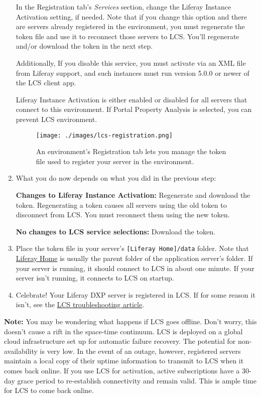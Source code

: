 \begin{enumerate}
  In the Registration tab's \emph{Services} section, change the Liferay
  Instance Activation setting, if needed. Note that if you change this
  option and there are servers already registered in the environment,
  you must regenerate the token file and use it to reconnect those
  servers to LCS. You'll regenerate and/or download the token in the
  next step.

  Additionally, If you disable this service, you must activate via an
  XML file from Liferay support, and such instances must run version
  5.0.0 or newer of the LCS client app.

  Liferay Instance Activation is either enabled or disabled for all
  servers that connect to this environment. If Portal Property Analysis
  is selected, you can prevent LCS environment.

  \begin{figure}
  \centering
  \texttt{[image: ./images/lcs-registration.png]}
  \caption{An environment's Registration tab lets you manage the token
  file used to register your server in the environment.}
  \end{figure}
\item
  What you do now depends on what you did in the previous step:

  \textbf{Changes to Liferay Instance Activation:} Regenerate and
  download the token. Regenerating a token causes all servers using the
  old token to disconnect from LCS. You must reconnect them using the
  new token.

  \textbf{No changes to LCS service selections:} Download the token.
\item
  Place the token file in your server's
  \texttt{{[}Liferay\ Home{]}/data} folder. Note that
  \href{/docs/7-2/deploy/-/knowledge_base/d/liferay-home}{Liferay Home}
  is usually the parent folder of the application server's folder. If
  your server is running, it should connect to LCS in about one minute.
  If your server isn't running, it connects to LCS on startup.
\item
  Celebrate! Your Liferay DXP server is registered in LCS. If for some
  reason it isn't, see the
  \href{/docs/7-2/deploy/-/knowledge_base/d/troubleshooting-your-lcs-connection}{LCS
  troubleshooting article}.
\end{enumerate}

\noindent\hrulefill

\textbf{Note:} You may be wondering what happens if LCS goes offline.
Don't worry, this doesn't cause a rift in the space-time continuum. LCS
is deployed on a global cloud infrastructure set up for automatic
failure recovery. The potential for non-availability is very low. In the
event of an outage, however, registered servers maintain a local copy of
their uptime information to transmit to LCS when it comes back online.
If you use LCS for activation, active subscriptions have a 30-day grace
period to re-establish connectivity and remain valid. This is ample time
for LCS to come back online.

